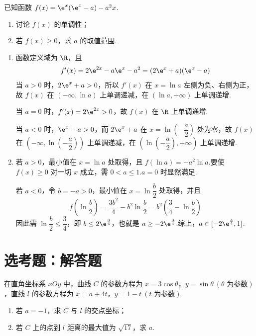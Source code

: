 \begin{problem}
已知函数 \(f(x)=\e^x(\e^x-a)-a^2x\).

\begin{enumerate}
\item 讨论 \(f(x)\) 的单调性；
\item 若 \(f(x)\ge 0\)，求 \(a\) 的取值范围.
\end{enumerate}
\end{problem}

\begin{solution}
\begin{enumerate}
\item 函数定义域为 \(\R\)，且
\[
f'(x)=2\e^{2x}-a\e^x-a^2=(2\e^x+a)(\e^x-a)
\]
当 \(a>0\) 时，\(2\e^x+a>0\)，所以 \(f'(x)\) 在 \(x=\ln a\) 左侧为负、右侧为正，故 \(f(x)\) 在 \((-\infty,\ln a)\) 上单调递减，在 \((\ln a,+\infty)\) 上单调递增.

当 \(a=0\) 时，\(f'(x)=2\e^{2x}>0\)，故 \(f(x)\) 在 \(\R\) 上单调递增.

当 \(a<0\) 时，\(\e^x-a>0\)，而 \(2\e^x+a\) 在 \(x=\ln\left(-\dfrac a2\right)\) 处为零，故 \(f(x)\) 在 \(\left(-\infty,\ln\left(-\dfrac a2\right)\right)\) 上单调递减，在 \(\left(\ln\left(-\dfrac a2\right),+\infty\right)\) 上单调递增.
\item 若 \(a>0\)，最小值在 \(x=\ln a\) 处取得，且 \(f(\ln a)=-a^2\ln a\).要使 \(f(x)\ge0\) 对一切 \(x\) 成立，需 \(0<a\le1\).\(a=0\) 时显然满足.

若 \(a<0\)，令 \(b=-a>0\)，最小值在 \(x=\ln\dfrac b2\) 处取得，并且
\[
f\left(\ln\frac b2\right)
=\frac{3b^2}{4}-b^2\ln\frac b2
=b^2\left(\frac34-\ln\frac b2\right)
\]
因此需 \(\ln\dfrac b2\le\dfrac34\)，即 \(b\le2\e^{\frac{3}{4}}\)，也就是 \(a\ge-2\e^{\frac{3}{4}}\).综上，\(a\in[-2\e^{\frac{3}{4}},1]\).
\end{enumerate}
\end{solution}


\section{选考题：解答题}

\begin{problem}
在直角坐标系 \(xOy\) 中，曲线 \(C\) 的参数方程为 \(x=3\cos\theta\)，\(y=\sin\theta\ (\theta\text{ 为参数})\)，直线 \(l\) 的参数方程为 \(x=a+4t\)，\(y=1-t\ (t\text{ 为参数})\).

\begin{enumerate}
\item 若 \(a=-1\)，求 \(C\) 与 \(l\) 的交点坐标；
\item 若 \(C\) 上的点到 \(l\) 距离的最大值为 \(\sqrt{17}\)，求 \(a\).
\end{enumerate}
\end{problem}

